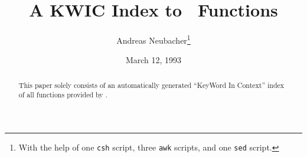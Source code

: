 

\newcommand{\desclabel}[1]{\hspace\labelsep \bf #1}
\renewenvironment{description}{
  \begin{list}{}{
    \labelwidth 0 pt \itemindent-\leftmargin
    \renewcommand{\makelabel}{\desclabel}
    \topsep 0 pt
    \parsep 0 pt
    \itemsep \parsep
  }
}{\end{list}}





\title{
  A KWIC Index to \saclib\ Functions
}

\author{
  Andreas Neubacher\thanks{
    With the help of one {\tt csh} script, three {\tt awk} scripts, and one
    {\tt sed} script.
  }
}

\date{March 12, 1993}
\maketitle

\begin{abstract}
This paper solely consists of an automatically generated ``KeyWord In Context''
index of all functions provided by \saclib.
\end{abstract}

\small

\normalsize



